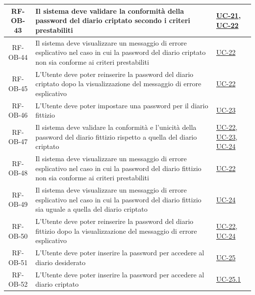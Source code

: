 \documentclass[a4paper,12pt]{article}
\begin{document}
\begin{center}
\begin{longtable}{|c|p{8.5cm}|>{\centering\arraybackslash}p{4cm}|}
RF-OB-43 & Il sistema deve validare la conformità della password del diario criptato secondo i criteri prestabiliti & \hyperref[subsec:UC-21]{UC-21}, \hyperref[subsec:UC-22]{UC-22} \\
\hline

RF-OB-44 & Il sistema deve visualizzare un messaggio di errore esplicativo nel caso in cui la password del diario criptato non sia conforme ai criteri prestabiliti & \hyperref[subsec:UC-22]{UC-22} \\
\hline

RF-OB-45 & L'Utente deve poter reinserire la password del diario criptato dopo la visualizzazione del messaggio di errore esplicativo & \hyperref[subsec:UC-22]{UC-22} \\
\hline

RF-OB-46 & L'Utente deve poter impostare una password per il diario fittizio & \hyperref[subsec:UC-23]{UC-23} \\
\hline

RF-OB-47 & Il sistema deve validare la conformità e l'unicità della password del diario fittizio rispetto a quella del diario criptato & \hyperref[subsec:UC-22]{UC-22}, \hyperref[subsec:UC-23]{UC-23}, \hyperref[subsec:UC-24]{UC-24} \\
\hline

RF-OB-48 & Il sistema deve visualizzare un messaggio di errore esplicativo nel caso in cui la password del diario fittizio non sia conforme ai criteri prestabiliti & \hyperref[subsec:UC-22]{UC-22} \\
\hline

RF-OB-49 & Il sistema deve visualizzare un messaggio di errore esplicativo nel caso in cui la password del diario fittizio sia uguale a quella del diario criptato & \hyperref[subsec:UC-24]{UC-24} \\
\hline

RF-OB-50 & L'Utente deve poter reinserire la password del diario fittizio dopo la visualizzazione del messaggio di errore esplicativo & \hyperref[subsec:UC-22]{UC-22}, \hyperref[subsec:UC-24]{UC-24} \\
\hline

RF-OB-51 & L'Utente deve poter inserire la password per accedere al diario desiderato & \hyperref[subsec:UC-25]{UC-25} \\
\hline

RF-OB-52 & L'Utente deve poter inserire la password per accedere al diario criptato & \hyperref[subsec:UC-25.1]{UC-25.1} \\
\hline


\end{longtable}
\end{center}
\end{document}
